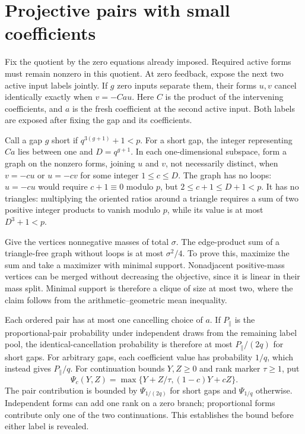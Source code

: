 \section{Projective pairs with small coefficients}\label{app:small-q-pairs}

Fix the quotient by the zero equations already imposed. Required active
forms must remain nonzero in this quotient. At zero feedback, expose
the next two active input labels jointly. If $g$ zero inputs separate
them, their forms $u,v$ cancel identically exactly when $v=-Cau$.
Here $C$ is the product of the intervening coefficients, and $a$ is the
fresh coefficient at the second active input. Both labels are exposed
after fixing the gap and its coefficients.

Call a gap $g$ short if $q^{3(g+1)}+1<p$. For a short gap, the integer
representing $Ca$ lies between one and $D=q^{g+1}$. In each
one-dimensional subspace, form a graph on the nonzero forms, joining
$u$ and $v$, not necessarily distinct, when $v=-cu$ or $u=-cv$ for
some integer $1\le c\le D$. The graph has no loops: $u=-cu$ would
require $c+1\equiv0$ modulo $p$, but $2\le c+1\le D+1<p$. It has no
triangles: multiplying the oriented ratios around a triangle requires a
sum of two positive integer products to vanish modulo $p$, while its
value is at most $D^3+1<p$.

Give the vertices nonnegative masses of total $\sigma$. The edge-product
sum of a triangle-free graph without loops is at most $\sigma^2/4$.
To prove this, maximize the sum and take a maximizer with minimal
support. Nonadjacent positive-mass vertices can be merged without
decreasing the objective, since it is linear in their mass split.
Minimal support is therefore a clique of size at most two, where the
claim follows from the arithmetic--geometric mean inequality.

Each ordered pair has at most one cancelling choice of $a$. If $P_\parallel$
is the proportional-pair probability under independent draws from the
remaining label pool, the identical-cancellation probability is therefore
at most $P_\parallel/(2q)$ for short gaps. For arbitrary gaps, each
coefficient value has probability $1/q$, which instead gives
$P_\parallel/q$.
For continuation bounds $Y,Z\ge0$ and rank marker $\tau\ge1$, put
\[
 \Psi_c(Y,Z)=\max\{Y+Z/\tau,(1-c)Y+cZ\}.
\]
The pair contribution is bounded by $\Psi_{1/(2q)}$ for short gaps and
$\Psi_{1/q}$ otherwise. Independent forms can add one rank on a zero
branch; proportional forms contribute only one of the two continuations.
This establishes the bound before either label is revealed.

